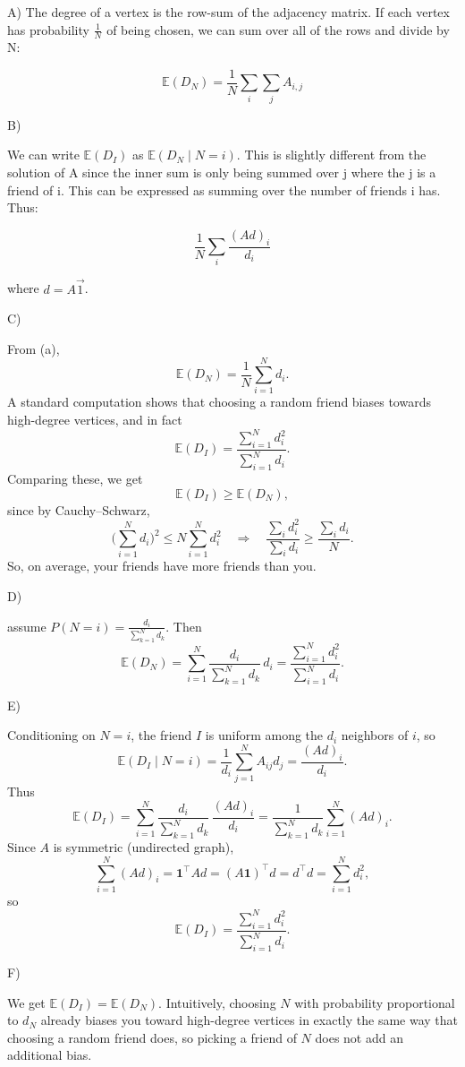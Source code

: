\documentclass{article}
\begin{document}
\begin{tcolorbox}

A)
The degree of a vertex is the row-sum of the adjacency matrix. If each vertex has probability $\frac{1}{N}$ of being chosen, we can sum over all of the rows and divide by N:

$$\mathbb{E}(D_N) = \frac{1}{N}\sum_i\sum_j A_{i,j}$$


B) 

We can write $\mathbb{E}(D_I)$ as $\mathbb{E}(D_N \mid N = i) $. This is slightly different from the solution of A since the inner sum is only being summed  over j where the j is a friend of i. This can be expressed as summing over the number of friends i has. Thus:

$$ \frac{1}{N} \sum_i \frac{(Ad)_i}{d_i} $$

where $d = A\vec{1}$. 


C)

From (a),
\[
\mathbb{E}(D_N)=\frac{1}{N}\sum_{i=1}^N d_i.
\]
A standard computation shows that choosing a random friend biases towards high-degree vertices, and in fact
\[
\mathbb{E}(D_I)=\frac{\sum_{i=1}^N d_i^2}{\sum_{i=1}^N d_i}.
\]
Comparing these, we get
\[
\mathbb{E}(D_I)\ge \mathbb{E}(D_N),
\]
since by Cauchy--Schwarz,
\[
\Big(\sum_{i=1}^N d_i\Big)^2 \le N\sum_{i=1}^N d_i^2
\quad\Longrightarrow\quad
\frac{\sum_i d_i^2}{\sum_i d_i}\ge \frac{\sum_i d_i}{N}.
\]
So, on average, your friends have more friends than you.

D)

assume $P(N=i)=\frac{d_i}{\sum_{k=1}^N d_k}$. Then
\[
\mathbb{E}(D_N)=\sum_{i=1}^N \frac{d_i}{\sum_{k=1}^N d_k}\,d_i
=\frac{\sum_{i=1}^N d_i^2}{\sum_{i=1}^N d_i}.
\]

E)

Conditioning on $N=i$, the friend $I$ is uniform among the $d_i$ neighbors of $i$, so
\[
\mathbb{E}(D_I\mid N=i)=\frac{1}{d_i}\sum_{j=1}^N A_{ij}d_j=\frac{(Ad)_i}{d_i}.
\]
Thus
\[
\mathbb{E}(D_I)=\sum_{i=1}^N \frac{d_i}{\sum_{k=1}^N d_k}\,\frac{(Ad)_i}{d_i}
=\frac{1}{\sum_{k=1}^N d_k}\sum_{i=1}^N (Ad)_i.
\]
Since $A$ is symmetric (undirected graph),
\[
\sum_{i=1}^N (Ad)_i = \mathbf{1}^\top Ad = (A\mathbf{1})^\top d = d^\top d = \sum_{i=1}^N d_i^2,
\]
so
\[
\mathbb{E}(D_I)=\frac{\sum_{i=1}^N d_i^2}{\sum_{i=1}^N d_i}.
\]

\end{tcolorbox}

\begin{tcolorbox}
F)

We get $\mathbb{E}(D_I)=\mathbb{E}(D_N)$. Intuitively, choosing $N$ with probability proportional to $d_N$ already biases you toward high-degree vertices in exactly the same way that choosing a random friend does, so picking a friend of $N$ does not add an additional bias.

\end{tcolorbox}
\end{document}

